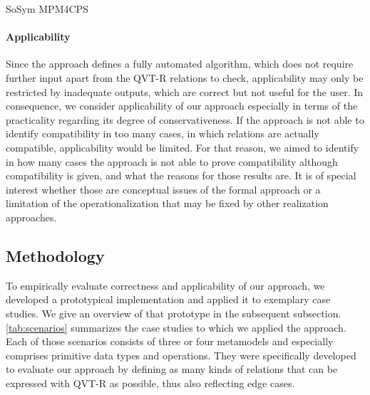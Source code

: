 \begin{copiedFrom}{SoSym MPM4CPS}
\paragraph{Applicability}
Since the approach defines a fully automated algorithm, which does not require further input apart from the QVT-R relations to check, applicability may only be restricted by inadequate outputs, which are correct but not useful for the user.
In consequence, we consider applicability of our approach especially in terms of the practicality regarding its degree of conservativeness.
If the approach is not able to identify compatibility in too many cases, in which relations are actually compatible, applicability would be limited.
For that reason, we aimed to identify in how many cases the approach is not able to prove compatibility although compatibility is given, and what the reasons for those results are.
It is of special interest whether those are conceptual issues of the formal approach or a limitation of the operationalization that may be fixed by other realization approaches.


\subsection{Methodology}
\label{sec:evaluation:methodology}

To empirically evaluate correctness and applicability of our approach, we developed a prototypical implementation and applied it to exemplary case studies.
We give an overview of that prototype in the subsequent subsection.
\autoref{tab:scenarios} summarizes the case studies to which we applied the approach.
Each of those scenarios consists of three or four metamodels and especially comprises primitive data types and operations.
They were specifically developed to evaluate our approach by defining as many kinds of relations that can be expressed with QVT-R as possible, thus also reflecting edge cases.


\end{copiedFrom}
